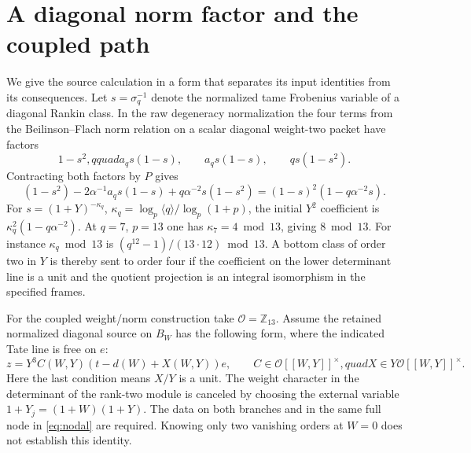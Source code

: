 \documentclass[11pt]{article}
\newcommand{\OO}{\mathcal O}
\begin{document}
\section{A diagonal norm factor and the coupled path}
We give the source calculation in a form that separates its
input identities from its consequences. Let $s=\sigma_q^{-1}$ denote
the normalized tame Frobenius variable of a diagonal Rankin class.
In the raw degeneracy normalization the four terms from the
Beilinson--Flach norm relation \cite[\S5]{KLZ} on a scalar
diagonal weight-two packet have factors
\[
 1-s^2,qquad a_qs(1-s),\qquad
 a_qs(1-s),\qquad qs(1-s^2).
\]
Contracting both factors by $P$ gives
\[
 (1-s^2)-2\alpha^{-1}a_qs(1-s)+q\alpha^{-2}s(1-s^2)
   =(1-s)^2(1-q\alpha^{-2}s).
\]
For $s=(1+Y)^{-\kappa_q}$, $\kappa_q=\log_p\langle q\rangle/
\log_p(1+p)$, the initial $Y^2$ coefficient is
$\kappa_q^2(1-q\alpha^{-2})$. At $q=7$, $p=13$ one has
$\kappa_7=4\bmod13$, giving $8\bmod13$. For instance
$\kappa_q\bmod13$ is
$(q^{12}-1)/(13\cdot12)\bmod13$. A bottom class of order two
in $Y$ is thereby sent to order four if the coefficient on the lower
determinant line is a unit and the quotient projection is an integral
isomorphism in the specified frames.

For the coupled weight/norm construction take $\OO=\mathbb Z_{13}$.
Assume the retained normalized diagonal source on $B_W$ has the
following form, where the indicated Tate line is free on $e$:
\begin{equation}\label{eq:nodal}
 z=Y^3 C(W,Y)(t-d(W)+X(W,Y))e,\qquad
 C\in\OO[[W,Y]]^\times,quad X\in Y\OO[[W,Y]]^\times .
\end{equation}
Here the last condition means $X/Y$ is a unit. The weight character
in the determinant of the rank-two module is canceled by choosing
the external variable $1+Y_j=(1+W)(1+Y)$. The data on both branches
and in the same full node in \eqref{eq:nodal} are required. Knowing
only two vanishing orders at $W=0$ does not establish this identity.
\end{document}

